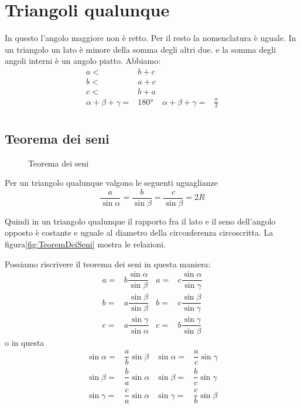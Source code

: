 \section{Triangoli qualunque}
In questo l'angolo maggiore non è  retto. Per il resto la nomenclatura è uguale. In un triangolo un lato è minore della somma degli altri due. e la somma degli angoli interni è un angolo piatto. Abbiamo:
 \begin{align*}
a<&b+c\\
b<&a+c\\
c<&b+a\\
\alpha+\beta+\gamma=&\ang{180}&\alpha+\beta+\gamma=&\frac{\pi}{2}\\
\end{align*}
\subsection{Teorema dei seni}
\begin{figure}
	\centering
	
	\caption{Teorema dei seni}
	\label{fig:TeoremDeiSeni}
\end{figure}
Per un triangolo qualunque valgono le seguenti uguaglianze\[\dfrac{a}{\sin\alpha}=\dfrac{b}{\sin\beta}=\dfrac{c}{\sin\beta}=2R \]

Quindi in un triangolo qualunque il rapporto fra il lato e il seno dell'angolo opposto è costante e uguale al diametro della circonferenza circoscritta. La figura\nobs\vref{fig:TeoremDeiSeni} mostra le relazioni.

Possiamo riscrivere il teorema dei seni in questa maniera: 
\begin{align*}
a=&b\dfrac{\sin\alpha}{\sin\beta}& a=&c\dfrac{\sin\alpha}{\sin\gamma}\\
b=&a\dfrac{\sin\beta}{\sin\beta}& b=&c\dfrac{\sin\beta}{\sin\gamma}\\
c=&a\dfrac{\sin\gamma}{\sin\alpha}& c=&b\dfrac{\sin\gamma}{\sin\beta}
\end{align*}
o in questa
\begin{align*}
\sin\alpha=&\dfrac{a}{b}\sin\beta&\sin\alpha=&\dfrac{a}{c}\sin\gamma\\
\sin\beta=&\dfrac{b}{a}\sin\alpha&\sin\beta=&\dfrac{b}{c}\sin\gamma\\
\sin\gamma=&\dfrac{c}{a}\sin\alpha&\sin\gamma=&\dfrac{c}{b}\sin\beta\\
\end{align*}
